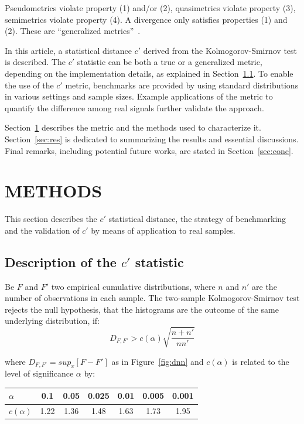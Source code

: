 \documentclass[12pt,fleqn]{article}
\begin{document}
Pseudometrics violate property (1) and/or (2),
quasimetrics violate property (3),
semimetrics violate property (4).
A divergence only satisfies properties (1) and (2).
These are ``generalized metrics''~\citep{wikiStatDist}.

In this article, a statistical distance $c'$ derived from the
Kolmogorov-Smirnov test is described.
The $c'$ statistic can be both a true or a generalized metric,
depending on the implementation details, as explained in Section~\ref{sec:desc}.
To enable the use of the $c'$ metric,
benchmarks are provided
by using standard distributions in various settings and sample sizes.
Example applications of the metric to quantify the difference among
real signals further validate the approach.

Section~\ref{sec:met} describes the metric
and the methods used to characterize it.
Section~\ref{sec:res} is dedicated to
summarizing the results and essential discussions.
Final remarks, including potential future works,
are stated in Section~\ref{sec:conc}.


\section{METHODS}\label{sec:met}
This section describes the $c'$ statistical distance,
the strategy of benchmarking and the validation of $c'$ by means
of application to real samples.


\subsection{Description of the $c'$ statistic}\label{sec:desc}
Be $F$ and $F'$ two empirical cumulative distributions,
where $n$ and $n'$ are the number of observations in each sample.
The two-sample Kolmogorov-Smirnov test rejects the null hypothesis,
that the histograms are the outcome of the same underlying distribution,
if:
\begin{equation}\label{eq:ks}
D_{F,F'} > c(\alpha)\sqrt{\frac{n+n'}{nn'}}
\end{equation}

\noindent where $D_{F,F'}=sup_x[F-F']$ as in Figure~\ref{fig:dnn}
and $c(\alpha)$ is related to the level of significance $\alpha$ by:

\begin{table}[h!]
\centering
\begin{tabular}{|l||c|c|c|c|c|c|}\hline
$\alpha$    & 0.1  & 0.05 & 0.025 & 0.01 & 0.005 & 0.001 \\\hline
$c(\alpha)$ & 1.22 & 1.36 & 1.48  & 1.63 & 1.73  & 1.95  \\\hline
\end{tabular}
\end{table}
\end{document}
